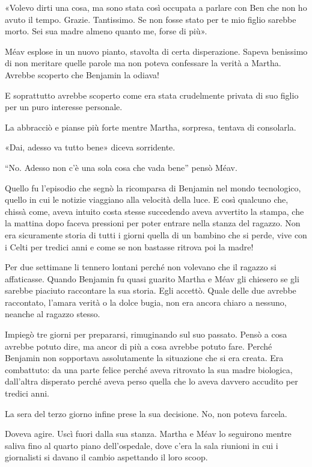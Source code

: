 \documentclass[a4paper,12pt]{book}
\begin{document}
«Volevo dirti una cosa, ma sono stata così occupata a parlare con Ben che non
ho avuto il tempo. Grazie. Tantissimo. Se non fosse stato per te mio figlio
sarebbe morto. Sei sua madre almeno quanto me, forse di più».

Méav esplose in un nuovo pianto, stavolta di certa disperazione. Sapeva
benissimo di non meritare quelle parole ma non poteva confessare la verità a
Martha. Avrebbe scoperto che Benjamin la odiava!

E soprattutto avrebbe scoperto come era stata crudelmente privata di suo figlio
per un puro interesse personale.

La abbracciò e pianse più forte mentre Martha, sorpresa, tentava di
consolarla.

«Dai, adesso va tutto bene» diceva sorridente.

``No. Adesso non c’è una sola cosa che vada bene'' pensò Méav.

Quello fu l’episodio che segnò la ricomparsa di Benjamin nel mondo
tecnologico, quello in cui le notizie viaggiano alla velocità della luce. E
così qualcuno che, chissà come, aveva intuito costa stesse succedendo aveva
avvertito la stampa, che la mattina dopo faceva pressioni per poter entrare
nella stanza del ragazzo. Non era sicuramente storia di tutti i giorni quella di
un bambino che si perde, vive con i Celti per tredici anni e come se non
bastasse ritrova poi la madre!

Per due settimane li tennero lontani perché non volevano che il ragazzo si
affaticasse. Quando Benjamin fu quasi guarito Martha e Méav gli chiesero se gli
sarebbe piaciuto raccontare la sua storia. Egli accettò. Quale delle due
avrebbe raccontato, l’amara verità o la dolce bugia, non era ancora chiaro a
nessuno, neanche al ragazzo stesso.

Impiegò tre giorni per prepararsi, rimuginando sul suo passato. Pensò a cosa
avrebbe potuto dire, ma ancor di più a cosa avrebbe potuto fare. Perché
Benjamin non sopportava assolutamente la situazione che si era creata. Era
combattuto: da una parte felice perché aveva ritrovato la sua madre biologica,
dall’altra disperato perché aveva perso quella che lo aveva davvero accudito
per tredici anni.

La sera del terzo giorno infine prese la sua decisione. No, non poteva farcela.

Doveva agire. Uscì fuori dalla sua stanza. Martha e Méav lo seguirono mentre
saliva fino al quarto piano dell’ospedale, dove c’era la sala riunioni in
cui i giornalisti si davano il cambio aspettando il loro scoop.
\end{document}
